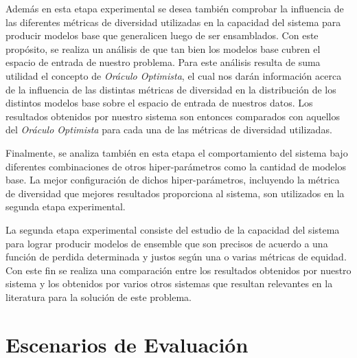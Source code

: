 Además en esta etapa experimental se desea también comprobar la influencia de las diferentes métricas de diversidad utilizadas en la capacidad del sistema para producir modelos base que generalicen luego de ser ensamblados.
Con este propósito, se realiza un análisis de que tan bien los modelos base cubren el espacio de entrada de nuestro problema.
Para este análisis resulta de suma utilidad el concepto de \emph{Oráculo Optimista}, el cual nos darán información acerca de la influencia de las distintas métricas de diversidad en la distribución de los distintos modelos base sobre el espacio de entrada de nuestros datos.
Los resultados obtenidos por nuestro sistema son entonces comparados con aquellos del \emph{Oráculo Optimista} para cada una de las métricas de diversidad utilizadas.

Finalmente, se analiza también en esta etapa el comportamiento del sistema bajo diferentes combinaciones de otros hiper-parámetros como la cantidad de modelos base.
La mejor configuración de dichos hiper-parámetros, incluyendo la métrica de diversidad que mejores resultados proporciona al sistema, son utilizados en la segunda etapa experimental.

La segunda etapa experimental consiste del estudio de la capacidad del sistema para lograr producir modelos de ensemble que son precisos de acuerdo a una función de perdida determinada y justos según una o varias métricas de equidad. 
Con este fin se realiza una comparación entre los resultados obtenidos por nuestro sistema y los obtenidos por varios otros sistemas que resultan relevantes en la literatura para la solución de este problema.

\section{Escenarios de Evaluación}

